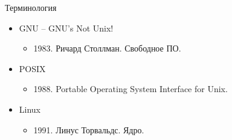 \begin{frame}{Терминология}
	\begin{itemize}
		\item GNU -- GNU's Not Unix!
		\begin{itemize}
			\item 1983. Ричард Столлман. Свободное ПО.
		\end{itemize}

		\pause

		\item POSIX
		\begin{itemize}
			\item 1988. Portable Operating System Interface for Unix. 
		\end{itemize}

		\pause

		\item Linux
		\begin{itemize}
			\item 1991. Линус Торвальдс. Ядро.
		\end{itemize}

	\end{itemize}
\end{frame}
